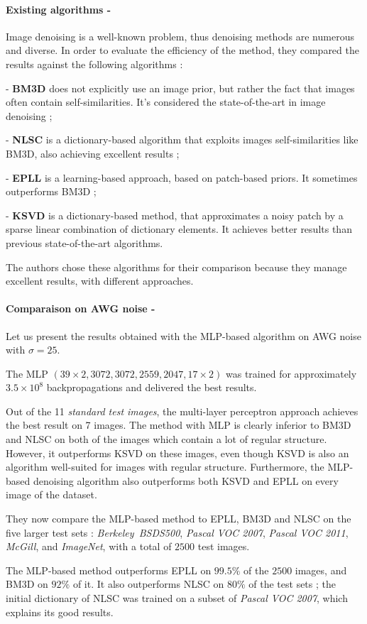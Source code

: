 \documentclass[10pt,a4paper]{article}
\newcommand{\svs}{\vspace{9pt}}
\newcommand{\ourparagraph}[1]{\paragraph{#1}}
\begin{document}
\ourparagraph{Existing algorithms -}{

Image denoising is a well-known problem, thus denoising methods are numerous and diverse. In order to evaluate the efficiency of the method, they compared the results against the following algorithms :

\svs

- \textbf{BM3D} does not explicitly use an image prior, but rather the fact that images often contain self-similarities. It's considered the state-of-the-art in image denoising ;

- \textbf{NLSC} is a dictionary-based algorithm that exploits images self-similarities like BM3D, also achieving excellent results ;

- \textbf{EPLL} is a learning-based approach, based on patch-based priors. It sometimes outperforms BM3D ;

- \textbf{KSVD} is a dictionary-based method, that approximates a noisy patch by a sparse linear combination of dictionary elements. It achieves better results than previous state-of-the-art algorithms.

\svs

The authors chose these algorithms for their comparison because they manage excellent results, with different approaches.}

\ourparagraph{Comparaison on AWG noise -}{
Let us present the results obtained with the MLP-based algorithm on AWG noise with $\sigma=25$.

\svs 

The MLP $(39 \times 2, 3072, 3072, 2559, 2047, 17 \times 2)$ was trained for approximately $3.5 \times 10^8$ backpropagations and delivered the best results.

\svs 

Out of the 11 \textit{standard test images}, the multi-layer perceptron approach achieves the best result on 7 images.
The method with MLP is clearly inferior to BM3D and NLSC on both of the images which contain a lot of regular structure. However, it outperforms KSVD on these images, even though KSVD is also an algorithm well-suited for images with regular structure. Furthermore, the MLP-based denoising algorithm also outperforms both KSVD and EPLL on every image of the dataset.

\svs

They now compare the MLP-based method to EPLL, BM3D and NLSC on the five larger test sets : \textit{Berkeley\ BSDS500}, \textit{Pascal VOC 2007}, \textit{Pascal VOC 2011}, \textit{McGill}, and \textit{ImageNet}, with a total of $2500$ test images.

\svs

The MLP-based method outperforms EPLL on $99.5\%$ of the $2500$ images, and BM3D on $92\%$ of it. It also outperforms NLSC on $80\%$ of the test sets ; the initial dictionary of NLSC was trained on a subset of \textit{Pascal VOC 2007}, which explains its good results.}
\end{document}
